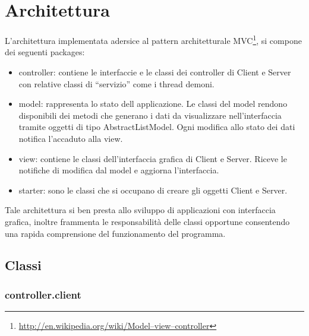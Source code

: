 \documentclass[
10pt, %
a4paper, %
oneside, %
BCOR5mm, %
]{scrartcl}
\begin{document}

\section{Architettura}
	
	L'architettura implementata adersice al pattern architetturale MVC\footnote{\href{http://en.wikipedia.org/wiki/Model–view–controller}{http://en.wikipedia.org/wiki/Model–view–controller}}, si compone dei seguenti packages:

		\begin{itemize}
			\item controller: contiene le interfaccie e le classi dei controller di Client e Server con relative classi di ``servizio'' come i thread demoni.
			\item model: rappresenta lo stato dell applicazione. Le classi del model rendono disponibili dei metodi che generano i dati da visualizzare nell'interfaccia tramite oggetti di tipo AbstractListModel. Ogni modifica allo stato dei dati notifica l'accaduto alla view.
			\item view: contiene le classi dell'interfaccia grafica di Client e Server. Riceve le notifiche di modifica dal model e aggiorna l'interfaccia.
			\item starter: sono le classi che si occupano di creare gli oggetti Client e Server.
		\end{itemize}

	Tale architettura si ben presta allo sviluppo di applicazioni con interfaccia grafica, inoltre frammenta le responsabilità delle classi opportune consentendo una rapida comprensione del funzionamento del programma.
	 
	\subsection{Classi}
 		
 		\subsubsection{controller.client}
 				
\end{document}
